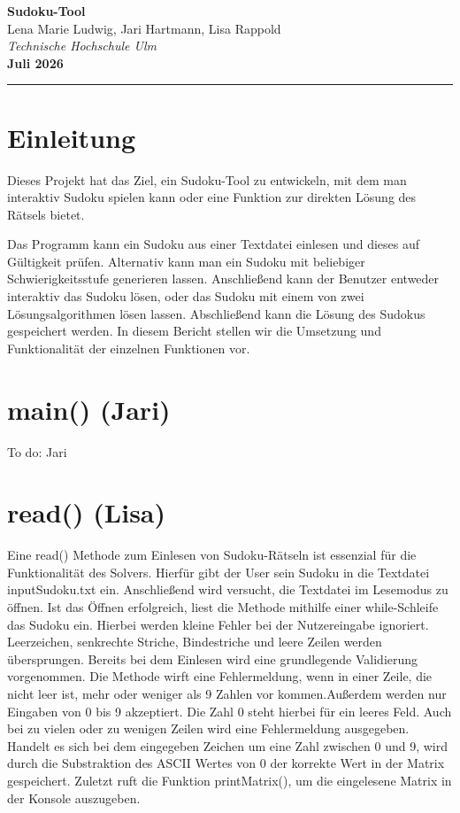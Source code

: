 \documentclass[a4paper,10pt]{article}
\newcommand{\berichtstitel}{Sudoku-Tool}
\newcommand{\autoren}{Lena Marie Ludwig, Jari Hartmann, Lisa Rappold}
\newcommand{\institution}{Technische Hochschule Ulm}
\newcommand{\datum}{Juli 2026}
\begin{document}
\thispagestyle{plain}
\begin{center}
    \LARGE \textbf{\berichtstitel} \\[0.4cm]
    \large \autoren \\[0.2cm]
    \small \textit{\institution} \\[0.3cm]
    \small \textbf{\datum} \\[0.2cm] 
    \rule{\linewidth}{1pt} 
\end{center}
\vspace{0.5cm}


\vspace{0.8cm}

\section{Einleitung}

Dieses Projekt hat das Ziel, ein Sudoku-Tool zu entwickeln, mit dem man interaktiv Sudoku spielen kann oder eine Funktion zur direkten Lösung des Rätsels bietet. 

Das Programm kann ein Sudoku aus einer Textdatei einlesen und dieses auf Gültigkeit prüfen. Alternativ kann man ein Sudoku mit beliebiger Schwierigkeitsstufe generieren lassen. Anschließend kann der Benutzer entweder interaktiv das Sudoku lösen, oder das Sudoku mit einem von zwei Lösungsalgorithmen lösen lassen. Abschließend kann die Lösung des Sudokus gespeichert werden.
In diesem Bericht stellen wir die Umsetzung und Funktionalität der einzelnen Funktionen vor.

\section{main() (Jari)}
To do: Jari

\section{read() (Lisa)}

Eine read() Methode zum Einlesen von Sudoku-Rätseln ist essenzial für die Funktionalität des Solvers. Hierfür gibt der User sein Sudoku in die Textdatei inputSudoku.txt ein. Anschließend wird versucht, die Textdatei im Lesemodus zu öffnen. Ist das Öffnen erfolgreich, liest die Methode mithilfe einer while-Schleife das Sudoku ein. Hierbei werden kleine Fehler bei der Nutzereingabe ignoriert. Leerzeichen, senkrechte Striche, Bindestriche und leere Zeilen werden übersprungen. Bereits bei dem Einlesen wird eine grundlegende Validierung vorgenommen. Die Methode wirft eine Fehlermeldung, wenn in einer Zeile, die nicht leer ist, mehr oder weniger als 9 Zahlen vor kommen.Außerdem werden nur Eingaben von 0 bis 9 akzeptiert. Die Zahl 0 steht hierbei für ein leeres Feld. Auch bei zu vielen oder zu wenigen Zeilen wird eine Fehlermeldung ausgegeben. Handelt es sich bei dem eingegeben Zeichen um eine Zahl zwischen 0 und 9, wird durch die Substraktion des ASCII Wertes von 0 der korrekte Wert in der Matrix gespeichert. Zuletzt ruft die Funktion printMatrix(), um die eingelesene Matrix in der Konsole auszugeben.
\end{document}
